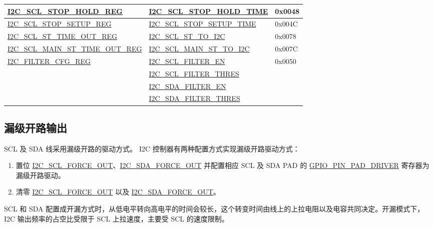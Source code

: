 \documentclass[main\_\_CN.tex]{subfiles}
\begin{document}
\begin{longtable}{ | p{6cm} | p{7cm} | p{2cm} | }
\hyperref[regdesc:I2CSCLSTOPHOLDREG]{I2C\_SCL\_STOP\_HOLD\_REG} & \hyperref[fielddesc:I2CSCLSTOPHOLDTIME]{I2C\_SCL\_STOP\_HOLD\_TIME} & 0x0048  \\ \hline
\hyperref[regdesc:I2CSCLSTOPSETUPREG]{I2C\_SCL\_STOP\_SETUP\_REG} & \hyperref[fielddesc:I2CSCLSTOPSETUPTIME]{I2C\_SCL\_STOP\_SETUP\_TIME} & 0x004C  \\ \hline

\hyperref[regdesc:I2CSCLSTTIMEOUTREG]{I2C\_SCL\_ST\_TIME\_OUT\_REG}& \hyperref[fielddesc:I2CSCLSTTOI2C]{I2C\_SCL\_ST\_TO\_I2C} & 0x0078\\ \hline
\hyperref[regdesc:I2CSCLMAINSTTIMEOUTREG]{I2C\_SCL\_MAIN\_ST\_TIME\_OUT\_REG}& \hyperref[fielddesc:I2CSCLMAINSTTOI2C]{I2C\_SCL\_MAIN\_ST\_TO\_I2C} & 0x007C\\ \hline

\hyperref[regdesc:I2CFILTERCFGREG]{I2C\_FILTER\_CFG\_REG} & {\hyperref[fielddesc:I2CSCLFILTEREN]{I2C\_SCL\_FILTER\_EN}} & 0x0050  \\\cline{2-2}
& {\hyperref[fielddesc:I2CSCLFILTERTHRES]{I2C\_SCL\_FILTER\_THRES}}& \\\cline{2-2}
& {\hyperref[fielddesc:I2CSDAFILTEREN]{I2C\_SDA\_FILTER\_EN}} &  \\\cline{2-2}
& {\hyperref[fielddesc:I2CSDAFILTERTHRES]{I2C\_SDA\_FILTER\_THRES}} & \\ \hline
\end{longtable}

\subsection{漏级开路输出}
SCL 及 SDA 线采用漏级开路的驱动方式。 I2C 控制器有两种配置方式实现漏级开路驱动方式：
\begin{enumerate}
\item 置位 \hyperref[fielddesc:I2CSCLFORCEOUT]{I2C\_SCL\_FORCE\_OUT}、\hyperref[fielddesc:I2CSDAFORCEOUT]{I2C\_SDA\_FORCE\_OUT} 并配置相应 SCL 及 SDA PAD 的 \hyperref[fielddesc:GPIOPINNPADDRIVER]{GPIO\_PIN\_PAD\_DRIVER} 寄存器为漏级开路驱动。
\item 清零 \hyperref[fielddesc:I2CSCLFORCEOUT]{I2C\_SCL\_FORCE\_OUT} 以及 \hyperref[fielddesc:I2CSDAFORCEOUT]{I2C\_SDA\_FORCE\_OUT}。
\end{enumerate}

SCL 和 SDA 配置成开漏方式时，从低电平转向高电平的时间会较长，这个转变时间由线上的上拉电阻以及电容共同决定。开漏模式下，I2C 输出频率的占空比受限于 SCL 上拉速度，主要受 SCL 的速度限制。
\end{document}
